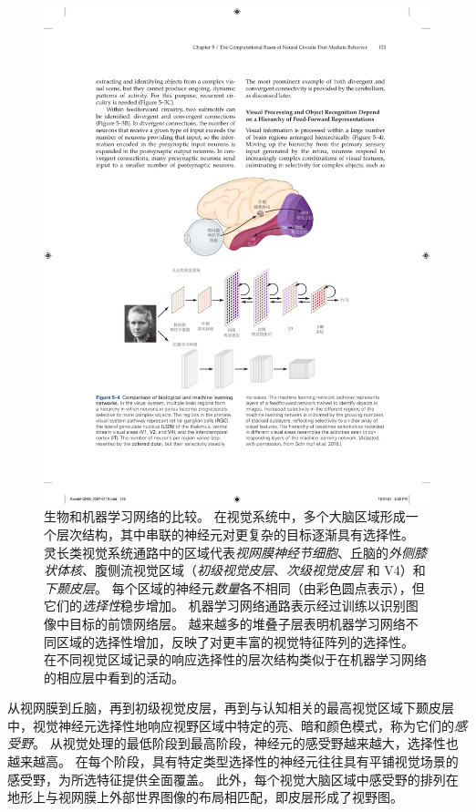\begin{figure}[htbp]
	\centering
	\includegraphics[width=1.0\linewidth]{chap05/fig_5_4}
	\caption{生物和机器学习网络的比较。
		在视觉系统中，多个大脑区域形成一个层次结构，其中串联的神经元对更复杂的目标逐渐具有选择性。
		灵长类视觉系统通路中的区域代表\textit{视网膜神经节细胞}、丘脑的\textit{外侧膝状体核}、腹侧流视觉区域（\textit{初级视觉皮层}、\textit{次级视觉皮层} 和 V4）和\textit{下颞皮层}。
		每个区域的神经元\textit{数量}各不相同（由彩色圆点表示），但它们的\textit{选择性}稳步增加。
		机器学习网络通路表示经过训练以识别图像中目标的前馈网络层。
		越来越多的堆叠子层表明机器学习网络不同区域的选择性增加，反映了对更丰富的视觉特征阵列的选择性。
		在不同视觉区域记录的响应选择性的层次结构类似于在机器学习网络的相应层中看到的活动\cite{schrimpf2018brain}。}
	\label{fig:5_4}
\end{figure}



从视网膜到丘脑，再到初级视觉皮层，再到与认知相关的最高视觉区域下颞皮层中，视觉神经元选择性地响应视野区域中特定的亮、暗和颜色模式，称为它们的\textit{感受野}。
从视觉处理的最低阶段到最高阶段，神经元的感受野越来越大，选择性也越来越高。
在每个阶段，具有特定类型选择性的神经元往往具有平铺视觉场景的感受野，为所选特征提供全面覆盖。
此外，每个视觉大脑区域中感受野的排列在地形上与视网膜上外部世界图像的布局相匹配，即皮层形成了视野图。


